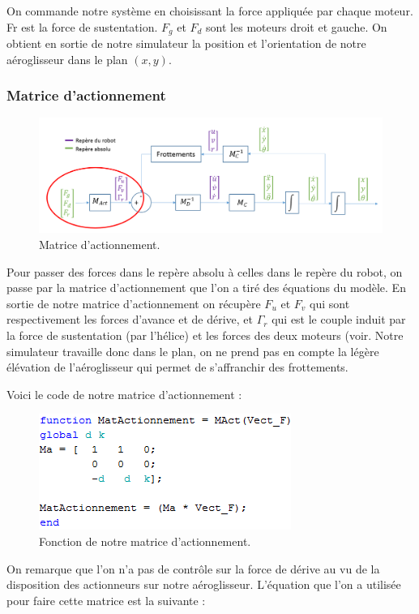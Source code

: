 \documentclass[a4paper,10pt]{article}
\begin{document}
On commande notre système en choisissant la force appliquée par chaque moteur. Fr est la force de sustentation. $F_g$ et $F_d$ sont les moteurs droit et gauche. On obtient en sortie de notre simulateur la position et l’orientation de notre aéroglisseur dans le plan $(x,y)$. 

\subsubsection{Matrice d'actionnement}
\begin{figure}[H]
\bigcenter\includegraphics[scale=0.5]{images/matrice_actionnement.png}
\caption{Matrice d'actionnement.}
\end{figure}

Pour passer des forces dans le repère absolu à celles dans le repère du robot, on passe par la matrice d’actionnement que l’on a tiré des équations du modèle. En sortie de notre matrice d’actionnement on récupère $F_u$ et $F_v$ qui sont respectivement les forces d’avance et de dérive, et $\Gamma_r$ qui est le couple induit par la force de sustentation (par l’hélice) et les forces des deux moteurs (voir. Notre simulateur travaille donc dans le plan, on ne prend pas en compte la légère élévation de l’aéroglisseur qui permet de s’affranchir des frottements. 

Voici le code de notre matrice d’actionnement :
\begin{figure}[H]
\bigcenter\includegraphics[scale=0.8]{images/actionnement.png}
\caption{Fonction de notre matrice d'actionnement.}
\end{figure}

On remarque que l’on n’a pas de contrôle sur la force de dérive au vu de la disposition des actionneurs sur notre aéroglisseur. 
L'équation que l’on a utilisée pour faire cette matrice est la suivante :
\end{document}
